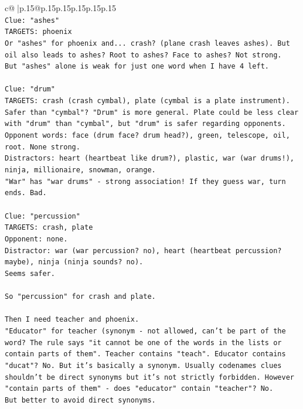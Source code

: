 \documentclass{article}
\begin{document}
{\begin{supertabular}{c@{$\;$}|p{.15\linewidth}@{}p{.15\linewidth}p{.15\linewidth}p{.15\linewidth}p{.15\linewidth}p{.15\linewidth}}
{{{\\ 
\texttt{Clue: "ashes"} \\
\texttt{TARGETS: phoenix} \\
\texttt{Or "ashes" for phoenix and... crash? (plane crash leaves ashes). But oil also leads to ashes? Root to ashes? Face to ashes? Not strong.} \\
\texttt{But "ashes" alone is weak for just one word when I have 4 left.} \\
\\ 
\texttt{Clue: "drum"} \\
\texttt{TARGETS: crash (crash cymbal), plate (cymbal is a plate instrument).} \\
\texttt{Safer than "cymbal"? "Drum" is more general. Plate could be less clear with "drum" than "cymbal", but "drum" is safer regarding opponents.} \\
\texttt{Opponent words: face (drum face? drum head?), green, telescope, oil, root. None strong.} \\
\texttt{Distractors: heart (heartbeat like drum?), plastic, war (war drums!), ninja, millionaire, snowman, orange.} \\
\texttt{"War" has "war drums" {-} strong association! If they guess war, turn ends. Bad.} \\
\\ 
\texttt{Clue: "percussion"} \\
\texttt{TARGETS: crash, plate} \\
\texttt{Opponent: none.} \\
\texttt{Distractor: war (war percussion? no), heart (heartbeat percussion? maybe), ninja (ninja sounds? no).} \\
\texttt{Seems safer.} \\
\\ 
\texttt{So "percussion" for crash and plate.} \\
\\ 
\texttt{Then I need teacher and phoenix.} \\
\texttt{"Educator" for teacher (synonym {-} not allowed, can't be part of the word? The rule says "it cannot be one of the words in the lists or contain parts of them". Teacher contains "teach". Educator contains "ducat"? No. But it's basically a synonym. Usually codenames clues shouldn't be direct synonyms but it's not strictly forbidden. However "contain parts of them" {-} does "educator" contain "teacher"? No.} \\
\texttt{But better to avoid direct synonyms.} \\
}}}
\end{supertabular}}
\end{document}
